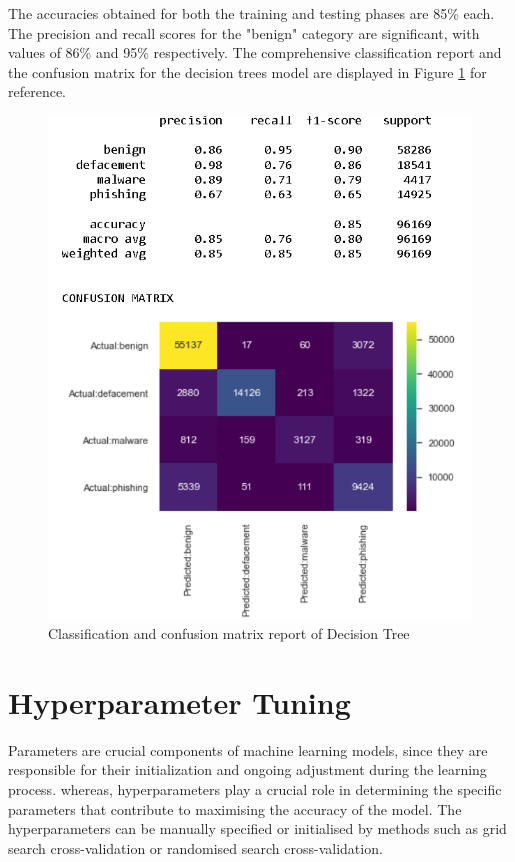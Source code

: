 The accuracies obtained for both the training and testing phases are 85\% each. The precision and recall scores for the "benign" category are significant, with values of 86\% and 95\% respectively. The comprehensive classification report and the confusion matrix for the decision trees model are displayed in Figure \ref{Classification and confusion matrix report of DT } for reference.

\begin{figure}[htb]
\centering
\centerline{\includegraphics[width=1\textwidth]{DTclassification.png}}
\caption{Classification and confusion matrix report of Decision Tree}
\label{Classification and confusion matrix report of DT }
\end{figure}

\newpage
\section{Hyperparameter Tuning}



Parameters are crucial components of machine learning models, since they are responsible for their initialization and ongoing adjustment during the learning process. whereas,\cite{YANG201361} hyperparameters play a crucial role in determining the specific parameters that contribute to maximising the accuracy of the model. The hyperparameters can be manually specified or initialised by methods such as grid search cross-validation or randomised search cross-validation.

